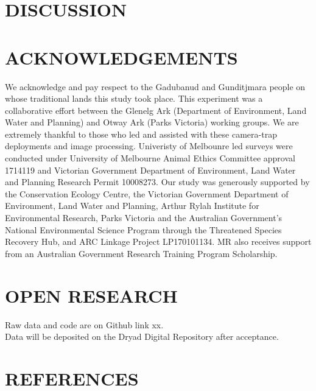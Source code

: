 \documentclass[]{elsarticle} %
\begin{document}
\newpage

\hypertarget{discussion}{%
\section{DISCUSSION}\label{discussion}}

\newpage

\hypertarget{acknowledgements}{%
\section{ACKNOWLEDGEMENTS}\label{acknowledgements}}

We acknowledge and pay respect to the Gadubanud and Gunditjmara people on whose traditional lands this study took place. This experiment was a collaborative effort between the Glenelg Ark (Department of Environment, Land Water and Planning) and Otway Ark (Parks Victoria) working groups. We are extremely thankful to those who led and assisted with these camera-trap deployments and image processing. Univeristy of Melbounre led surveys were conducted under University of Melbourne Animal Ethics Committee approval 1714119 and Victorian Government Department of Environment, Land Water and Planning Research Permit 10008273. Our study was generously supported by the Conservation Ecology Centre, the Victorian Government Department of Environment, Land Water and Planning, Arthur Rylah Institute for Environmental Research, Parks Victoria and the Australian Government's National Environmental Science Program through the Threatened Species Recovery Hub, and ARC Linkage Project LP170101134. MR also receives support from an Australian Government Research Training Program Scholarship.

\hypertarget{open-research}{%
\section{OPEN RESEARCH}\label{open-research}}

Raw data and code are on Github link xx.\\
Data will be deposited on the Dryad Digital Repository after acceptance.

\newpage

\hypertarget{references}{%
\section*{REFERENCES}\label{references}}
\end{document}
